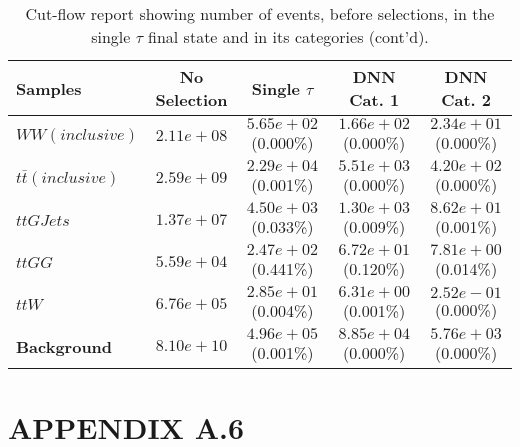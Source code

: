 \begin{landscape}
\begin{table}
\centering
\caption{Cut-flow report showing number of events, before selections, in the single $\tau$ final state and in its categories (cont'd).}
\begin{tabular}{ |l|c|c|c|c| }
    \hline
    Samples                                & No Selection                   & Single $\tau$        & DNN Cat. 1        & DNN Cat. 2       \\
    \hline
    $WW(inclusive)$ &  $2.11e+08$  &   $5.65e+02$ (0.000\%) &  $1.66e+02$ (0.000\%) &  $2.34e+01$ (0.000\%) \\
                    $t\bar{t} (inclusive)$ &  $2.59e+09$  &   $2.29e+04$ (0.001\%) &  $5.51e+03$ (0.000\%) &  $4.20e+02$ (0.000\%) \\
                                 $ttGJets$ &  $1.37e+07$  &   $4.50e+03$ (0.033\%) &  $1.30e+03$ (0.009\%) &  $8.62e+01$ (0.001\%) \\
                                    $ttGG$ &  $5.59e+04$  &   $2.47e+02$ (0.441\%) &  $6.72e+01$ (0.120\%) &  $7.81e+00$ (0.014\%) \\
                                     $ttW$ &  $6.76e+05$  &   $2.85e+01$ (0.004\%) &  $6.31e+00$ (0.001\%) &  $2.52e-01$ (0.000\%) \\
                       \textbf{Background} &  $8.10e+10$  &   $4.96e+05$ (0.001\%) &  $8.85e+04$ (0.000\%) &  $5.76e+03$ (0.000\%) \\
    \hline
\end{tabular}
\end{table}
\end{landscape}
\newpage


\section*{APPENDIX A.6}

